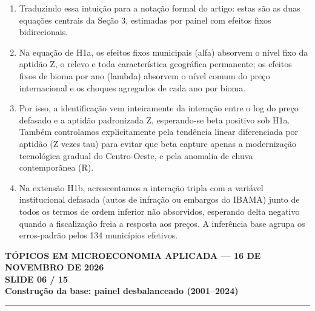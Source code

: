 \documentclass[11pt,a4paper]{article}
\newcommand{\slidenum}{1}
\begin{document}
\vspace{0.8mm}
\begin{enumerate}[leftmargin=*,label=\textbf{(\arabic*)},itemsep=2.8mm,topsep=1mm]
    \item Traduzindo essa intuição para a notação formal do artigo: estas são as duas equações centrais da Seção 3, estimadas por painel com efeitos fixos bidirecionais.
    \item Na equação de H1a, os efeitos fixos municipais (alfa) absorvem o nível fixo da aptidão Z, o relevo e toda característica geográfica permanente; os efeitos fixos de bioma por ano (lambda) absorvem o nível comum do preço internacional e os choques agregados de cada ano por bioma.
    \item Por isso, a identificação vem inteiramente da interação entre o log do preço defasado e a aptidão padronizada Z, esperando-se beta positivo sob H1a. Também controlamos explicitamente pela tendência linear diferenciada por aptidão (Z vezes tau) para evitar que beta capture apenas a modernização tecnológica gradual do Centro-Oeste, e pela anomalia de chuva contemporânea (R).
    \item Na extensão H1b, acrescentamos a interação tripla com a variável institucional defasada (autos de infração ou embargos do IBAMA) junto de todos os termos de ordem inferior não absorvidos, esperando delta negativo quando a fiscalização freia a resposta aos preços. A inferência base agrupa os erros-padrão pelos 134 municípios efetivos.
\end{enumerate}

\newpage

\renewcommand{\slidenum}{6}
\noindent
\begin{minipage}{\textwidth}
\begin{center}
{\color{cinza}\footnotesize\textbf{TÓPICOS EM MICROECONOMIA APLICADA --- 16 DE NOVEMBRO DE 2026}\\[1.2mm]}
{\color{cinza}\bfseries\Large SLIDE 06 / 15\\[1.5mm]}
{\color{verde}\bfseries\LARGE Construção da base: painel desbalanceado (2001--2024)\\[2.5mm]}
\rule{\textwidth}{1pt}
\end{center}
\end{minipage}
\vspace{1.5mm}
\end{document}
